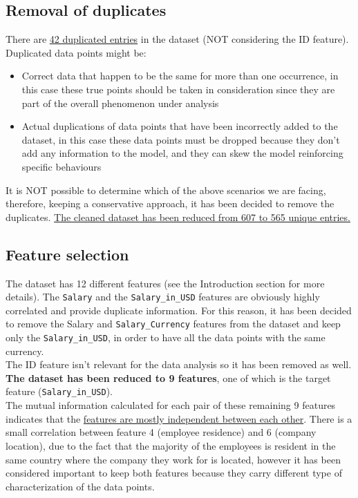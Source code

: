 \documentclass[11pt,a4paper]{article}
\begin{document}
\subsection{Removal of duplicates} 
There are \uline{42 duplicated entries} in the dataset (NOT considering the ID feature). Duplicated data points might be:
\begin{itemize}
\item Correct data that happen to be the same for more than one occurrence, in this case these true points should be taken in consideration since they are part of the overall phenomenon under analysis
\item Actual duplications of data points that have been incorrectly added to the dataset, in this case these data points must be dropped because they don’t add any information to the model, and they can skew the model reinforcing specific behaviours
\end{itemize}
It is NOT possible to determine which of the above scenarios we are facing, therefore, keeping a conservative approach, it has been decided to remove the duplicates. \uline{The cleaned dataset has been reduced from 607 to 565 unique entries.}
\subsection{Feature selection} 
The dataset has 12 different features (see the Introduction section for more details).
The \texttt{Salary} and the \texttt{Salary\_in\_USD} features are obviously highly correlated and provide duplicate information. For this reason, it has been decided to remove the Salary and \texttt{Salary\_Currency} features from the dataset and keep only the \texttt{Salary\_in\_USD}, in order to have all the data points with the same currency.
\\
The ID feature isn’t relevant for the data analysis so it has been removed as well. \textbf{The dataset has been reduced to 9 features}, one of which is the target feature (\texttt{Salary\_in\_USD}).
\\
The mutual information calculated for each pair of these remaining 9 features indicates that the \uline{features are mostly independent between each other}. There is a small correlation between feature 4 (employee residence) and 6 (company location), due to the fact that the majority of the employees is resident in the same country where the company they work for is located, however it has been considered important to keep both features because they carry different type of characterization of the data points.  
\end{document}

